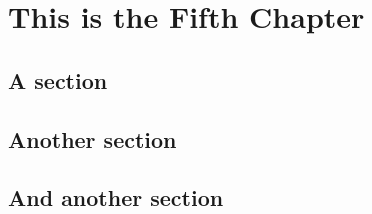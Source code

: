 \documentclass[../ThesisMain]{subfiles}
\begin{document}
\doublespacing%
\chapter{This is the Fifth Chapter}\label{chap:5}
\section{A section}
\lipsum[0-1]

\section{Another section}
\lipsum[0-1]

\section{And another section}
\lipsum[0-1]
\end{document}

